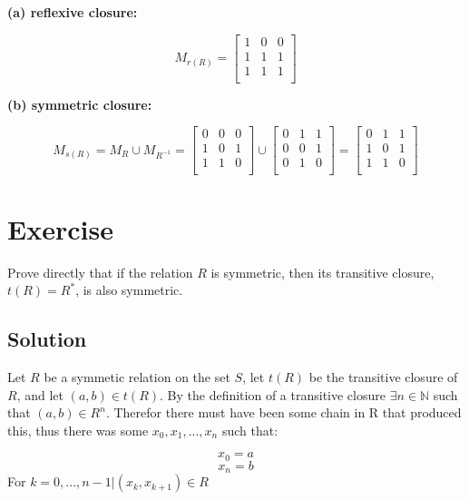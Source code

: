 \documentclass[paper=a4, fontsize=11pt]{scrartcl} %
\numberwithin{equation}{section} %
\numberwithin{figure}{section} %
\numberwithin{table}{section} %
\begin{document}
\textbf{(a) reflexive closure:}

$$M_{r(R)} = \begin{bmatrix}
1 & 0 & 0  \\
1 & 1 & 1  \\
1 & 1 & 1 \\
\end{bmatrix}$$

\textbf{(b) symmetric closure:}

$$M_{s(R)} = M_R \cup M_{R^{-1}} = \begin{bmatrix}
0 & 0 & 0  \\
1 & 0 & 1  \\
1 & 1 & 0 \\
\end{bmatrix} \cup 
\begin{bmatrix}
0 & 1 & 1  \\
0 & 0 & 1  \\
0 & 1 & 0 \\
\end{bmatrix} = 
\begin{bmatrix}
0 & 1 & 1  \\
1 & 0 & 1  \\
1 & 1 & 0 \\
\end{bmatrix}$$


\section{Exercise}

Prove directly that if the relation $R$ is symmetric, then its transitive closure, $t(R) = R^*$, is also symmetric.

\subsection{Solution}

Let $R$ be a symmetic relation on the set $S$, let $t(R)$ be the transitive closure of $R$, and let $(a,b) \in t(R)$. By the definition of a transitive closure $\exists n \in \mathbb{N}$ such that $(a, b) \in R^n$. Therefor there must have been some chain in R that produced this, thus there was some $x_0, x_1,..., x_n$ such that:

$$x_0 = a$$
$$x_n = b$$
For $k = 0,..., n - 1 \vert (x_k, x_{k+1}) \in R$
\end{document}
